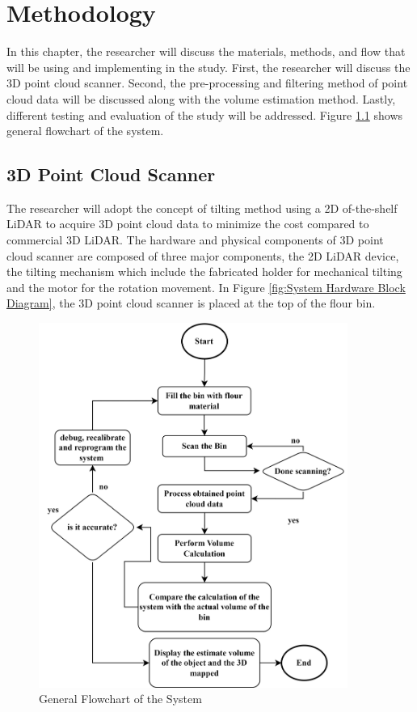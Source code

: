 \renewcommand{\thechapter}{\Roman{chapter}}
\chapter{Methodology}
\renewcommand{\thechapter}{\arabic{chapter}}
\label{ch:Methodology}
\thispagestyle{empty}

In this chapter, the researcher will discuss the materials, methods, and flow that will be using and implementing in the study. First, the researcher will discuss the 3D point cloud scanner. Second, the pre-processing and filtering method of point cloud data will be discussed along with the volume estimation method. Lastly, different testing and evaluation of the study will be addressed. Figure \ref{fig:General flowchart of the system} shows general flowchart of the system. 

\section{3D Point Cloud Scanner}
\label{methdo:sec:System Hardware}

The researcher will adopt the concept of tilting method using a 2D of-the-shelf LiDAR to acquire 3D point cloud data to minimize the cost compared to commercial 3D LiDAR. The hardware and physical components of 3D point cloud scanner are composed of three major components, the 2D LiDAR device, the tilting mechanism which include the fabricated holder for mechanical tilting and the motor for the rotation movement. In Figure \ref{fig:System Hardware Block Diagram}, the 3D point cloud scanner is placed at the top of the flour bin.

\begin{figure}
    \centering
    \includegraphics[width=0.9\textwidth]{Figures/general-flowchart-of-the-system-2.jpg}
    \caption{General Flowchart of the System}
    \label{fig:General flowchart of the system}
\end{figure}

